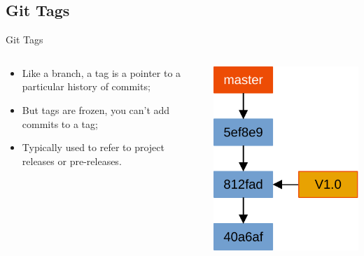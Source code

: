 \documentclass{beamer}
\begin{document}
\subsection{Git Tags}
\begin{frame}{Git Tags}
  \begin{columns}
    \begin{column}{0.6\textwidth}
      \begin{itemize}
        \item Like a branch, a tag is a pointer to a particular history of commits;
        \item But tags are frozen, you can't add commits to a tag;
        \item Typically used to refer to project releases or pre-releases.
      \end{itemize}
    \end{column}
    \begin{column}{0.4\textwidth}
      \begin{center}
        \includegraphics[scale=0.5]{git-tag}
      \end{center}
    \end{column}
  \end{columns}
\end{frame}
\end{document}
